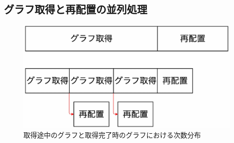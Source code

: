 \subsection{グラフ取得と再配置の並列処理}
\begin{figure}[t]
  \centering
  \includegraphics[width=\linewidth]{./figure/dbg-ee_para.pdf}
  \caption{取得途中のグラフと取得完了時のグラフにおける次数分布}
  \label{degree_appro}
\end{figure}